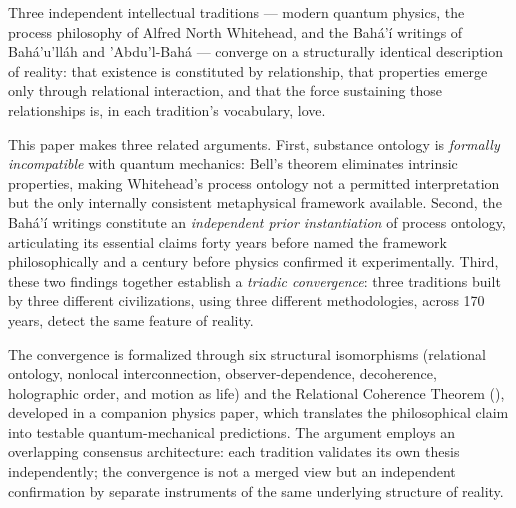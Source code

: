 
Three independent intellectual traditions --- modern quantum physics, the
process philosophy of Alfred North Whitehead, and the Bahá'í writings of
Bahá'u'lláh and 'Abdu'l-Bahá --- converge on a structurally identical
description of reality: that existence is constituted by relationship, that
properties emerge only through relational interaction, and that the force
sustaining those relationships is, in each tradition's vocabulary, love.

This paper makes three related arguments.
First, substance ontology is \emph{formally incompatible} with quantum mechanics:
Bell's theorem \citep{Bell1964} eliminates intrinsic properties, making
Whitehead's process ontology not a permitted interpretation but the only
internally consistent metaphysical framework available.
Second, the Bahá'í writings constitute an \emph{independent prior instantiation}
of process ontology, articulating its essential claims forty years before
\citet{Whitehead1929} named the framework philosophically and a century before
physics confirmed it experimentally.
Third, these two findings together establish a \emph{triadic convergence}:
three traditions built by three different civilizations, using three different
methodologies, across 170 years, detect the same feature of reality.

The convergence is formalized through six structural isomorphisms (relational
ontology, nonlocal interconnection, observer-dependence, decoherence, holographic
order, and motion as life) and the Relational Coherence Theorem (\RCT),
developed in a companion physics paper, which translates the philosophical claim
into testable quantum-mechanical predictions.
The argument employs an overlapping consensus architecture: each tradition
validates its own thesis independently; the convergence is not a merged view
but an independent confirmation by separate instruments of the same underlying
structure of reality.

